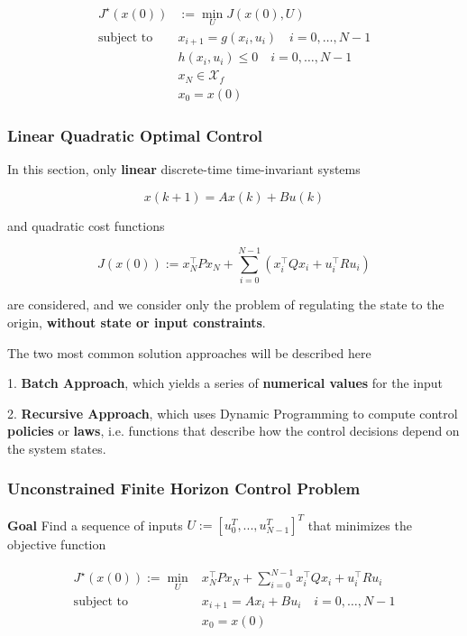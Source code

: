 $$\begin{aligned}
		J^\star(x(0)) & :=  \min_{U}J(x(0),U)                    \\
		\text{subject to  }
		              & x_{i+1}                = g(x_i,u_i )
		\quad i  = 0,\dots,N-1                                   \\
		              & h(x_i,u_i)             \le 0
		\quad i  = 0,\dots,N-1                                   \\
		              & x_N                    \in \mathcal{X}_f \\
		              & x_0                    = x(0)
	\end{aligned}$$



\subsubsection{Linear Quadratic Optimal Control}

In this section,
only \textbf{linear} discrete-time time-invariant systems

$$x(k + 1) = Ax(k) + Bu(k)$$

and quadratic cost functions

$$
	J(x(0)) :=  x_N^\top P x_N +
	\sum_{i=0}^{N-1}(x_i^\top Q x_i + u_i^\top R u_i)
$$

are considered, and we consider only the problem of
regulating the state to the origin,
\textbf{without state or input constraints}.

The two most common solution approaches will be described here

1. \textbf{Batch Approach}, which yields a
series of \textbf{numerical values} for the input

2. \textbf{Recursive Approach}, which uses Dynamic Programming
to compute control \textbf{policies} or \textbf{laws}, i.e. functions that
describe how the control decisions depend on the system states.

\subsubsection{Unconstrained Finite Horizon Control Problem}
\textbf{Goal} Find a sequence of inputs
$U := [u_0^T,...,u_{N-1}^T]^T$ %
that minimizes the objective function


$$\begin{aligned}
		J^\star(x(0)) :=
		\min_U & x_N^\top P x_N +
		\sum_{i=0}^{N-1}
		x_i^\top Q x_i + u_i^\top R u_i
		\\
		\text{subject to  }
		       & x_{i+1}                = Ax_i+Bu_i
		\quad i  = 0,\dots,N-1                      \\
		       & x_0                    = x(0)
	\end{aligned}$$

